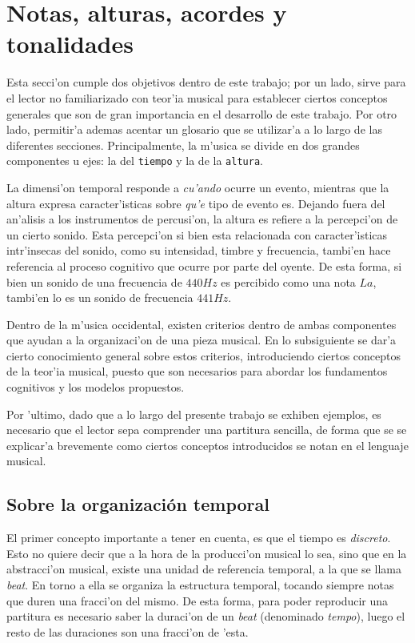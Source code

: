 \section{Notas, alturas, acordes y tonalidades}
\label{sec_cogn_bg}
Esta secci'on cumple dos objetivos dentro de este trabajo; por un lado, sirve para el lector no familiarizado con teor'ia musical para establecer
ciertos conceptos generales que son de gran importancia en el desarrollo de este trabajo. Por otro lado, permitir'a ademas acentar un glosario
que se utilizar'a a lo largo de las diferentes secciones.
Principalmente, la m'usica se divide en dos grandes componentes u ejes: la del \texttt{tiempo} y la de la \texttt{altura}. 

La dimensi'on temporal responde a \emph{cu'ando} ocurre un evento, mientras que la altura expresa caracter'isticas sobre \emph{qu'e}
tipo de evento es.  Dejando fuera del an'alisis a los instrumentos de percusi'on, la altura es refiere a la percepci'on de un cierto sonido. 
Esta percepci'on si bien esta relacionada con caracter'isticas intr'insecas del sonido, como su intensidad, timbre y frecuencia, 
tambi'en hace referencia
al proceso cognitivo que ocurre por parte del oyente. De esta forma, si bien un sonido de una frecuencia de $440Hz$ es percibido como una nota 
$La$, tambi'en lo es un sonido de frecuencia $441Hz$.

Dentro de la m'usica occidental, existen criterios dentro de ambas componentes que ayudan a la organizaci'on de una pieza musical. 
En lo subsiguiente se dar'a cierto conocimiento general sobre estos criterios, introduciendo ciertos conceptos de la teor'ia musical, puesto que son necesarios
para abordar los fundamentos cognitivos y los modelos propuestos. 

Por 'ultimo, dado que a lo largo del presente trabajo se exhiben ejemplos, es necesario que el lector sepa comprender una partitura sencilla, de forma que se se 
explicar'a brevemente como ciertos conceptos introducidos se notan en el lenguaje musical.

\subsection{Sobre la organizaci\'on temporal}
El primer concepto importante a tener en cuenta, es que el tiempo es \emph{discreto}. Esto no quiere decir que a la hora de la producci'on musical lo sea, sino que 
en la abstracci'on musical, existe una unidad de referencia temporal, a la que se llama \emph{beat}. En torno a ella se organiza la estructura temporal, tocando
siempre notas que duren una fracci'on del mismo. De esta forma, para poder reproducir una partitura es necesario saber la duraci'on de un \emph{beat} (denominado
\emph{tempo}), luego el resto de las duraciones son una fracci'on de 'esta.

